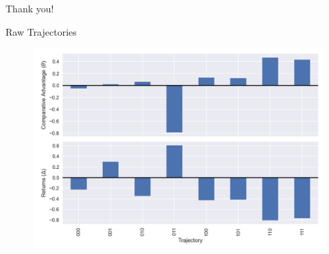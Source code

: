 \documentclass{beamer}
\begin{document}
\begin{frame}{}
    Thank you!
\end{frame}

\begin{frame}{Raw Trajectories}
    \begin{figure}
        \centering
        \includegraphics[scale=.5]{results/figures/theta.png}
    \end{figure}
\end{frame}



\end{document}
